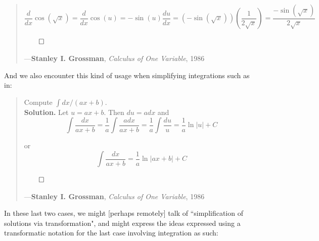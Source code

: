 \documentclass[a4paper, 18pt]{book} %
\begin{document}
\begin{appendices}
\begin{minipage}{1\textwidth}
\begin{quotation}
{\[\frac{d}{dx} \cos(\sqrt{x}) = \frac{d}{dx} \cos(u) = -\sin(u)\frac{du}{dx} = (-\sin(\sqrt{x}))(\frac{1}{2\sqrt{x}}) = \frac{-\sin(\sqrt{x})}{2\sqrt{x}}\]

$\qed$\\
}
\hspace*{\fill} ---\textbf{Stanley I. Grossman}, \textit{Calculus of One Variable}, 1986\cite{Grossman1986CalculusOneVariable}
\end{quotation}
\vspace{1em}
\end{minipage}

\vspace{2em}

And we also encounter this kind of usage when simplifying integrations such as in:



\noindent
\begin{minipage}{1\textwidth}
\vspace{1em}
\begin{quotation}
{\ttfamily

Compute $\int dx/(ax +b)$.\\

\textbf{Solution.} Let $u = ax + b$. Then $du = a dx$ and\\

\[\int \frac{dx}{ax + b} = \frac{1}{a} \int \frac{a dx}{ax + b} = \frac{1}{a} \int \frac{du}{u} = \frac{1}{a} \ln |u| + C\]

or\\

\[\int \frac{dx}{ax + b} = \frac{1}{a} \ln |ax + b| + C\]

$\qed$\\
}
\hspace*{\fill} ---\textbf{Stanley I. Grossman}, \textit{Calculus of One Variable}, 1986\cite{Grossman1986CalculusOneVariable}
\end{quotation}
\vspace{1em}
\end{minipage}

\vspace{2em}


In these last two cases, we might [perhaps remotely] talk of ``simplification of solutions via transformation", and might express the ideas expressed using a transformatic notation for the last case involving integration as such:

\vspace{2em}


\end{appendices}
\end{document}
